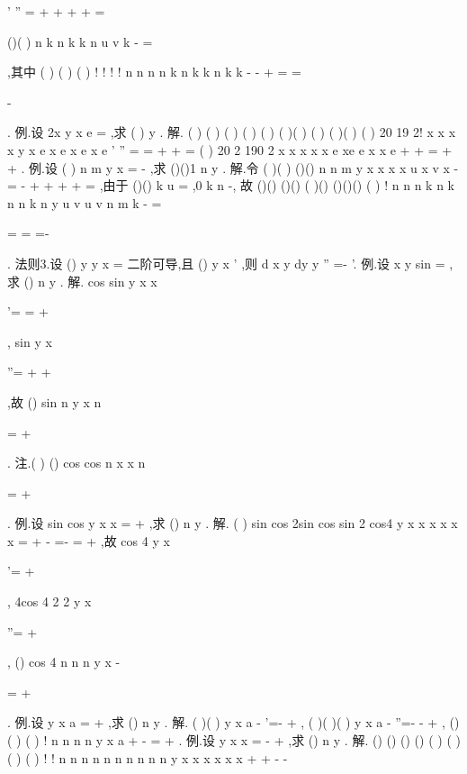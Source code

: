 '
''
=
+
+
+
+
=






\Lambda 
()(
)
n
k
n k
k
n u
v
k
-
=



\sum 
,其中
(
)
(
)
(
)
!
!
! !
n
n n
n
k
n
k
k
n
k
k
-
-
+
=
=

-

\Lambda 
. 
\textcolor{lyred}{例}.设
2x
y
x e
=
,求
(
)
y
. 
解.
(
)
(
)
(
)
(
)
(
)
(
)(
)
(
)
(
)(
)
(
)
20 19
2!
x
x
x
x
y
x
e
x
e
x
e
x
e
\cdots 
'
''
=
\cdots 
=
\cdots 
+
+
= 
(
)
20 2
190 2
x
x
x
x
x e
xe
e
x
x
e
+
\cdots 
\cdots 
+
\cdots 
\cdots 
=
+
+
. 
\textcolor{lyred}{例}.设
(
)
n
m
y
x
=
-
,求
()()1
n
y
. 
解.令
(
)(
)
()()
n
n
m
y
x
x
x
x
u x v x
-
=
-
+
+
+
+
=
\Lambda 
,由于
()()
k
u
=
,0
k
n
\le 
\le 
-, 
故
()()
()()
(
)()
()()()
(
)
!
n
n
n
k
n k
n
n
k
n
y
u
v
u
v
n m
k
-
=

=
=
=-
\cdots 


\sum 
. 
\textcolor{lyred}{法则3}.设
()
y
y x
=
二阶可导,且
()
y x
'
\neq 
,则
d x
y
dy
y
''
=-
'. 
\textcolor{lyred}{例}.设
x
y
sin
=
,求
()
n
y
. 
解.
cos
sin
y
x
x
\pi 


'=
=
+




,
sin
y
x
\pi 
\pi 


''=
+
+




,故
()
sin
n
y
x
n \pi 


=
+
\cdots 




. 
\textcolor{lyred}{注}.(
)
()
cos
cos
n
x
x
n \pi 


=
+
\cdots 




. 
\textcolor{lyred}{例}.设
sin
cos
y
x
x
=
+
,求
()
n
y
. 
解.
(
)
sin
cos
2sin
cos
sin 2
cos4
y
x
x
x
x
x
x
=
+
-
=-
=
+
,故 
cos 4
y
x
\pi 


'=
+




,
4cos 4
2 2
y
x
\pi 


''=
+\cdots 




,
()
cos 4
n
n
n
y
x
\pi 
-


=
+




. 
\textcolor{lyred}{例}.设
y
x
a
=
+
,求
()
n
y
. 
解.
(
)(
)
y
x
a
-
'=-
+
,
(
)(
)(
)
y
x
a
-
''=-
-
+
,
()
(
)
(
)
!
n
n
n
n
y
x
a
+
-
=
+
. 
\textcolor{lyred}{例}.设
y
x
x
=
-
+
,求
()
n
y
. 
解.
()
()
()
()
(
)
(
)
(
)
(
)
!
!
n
n
n
n
n
n
n
n
n
n
y
x
x
x
x
x
x
+
+
-
-






